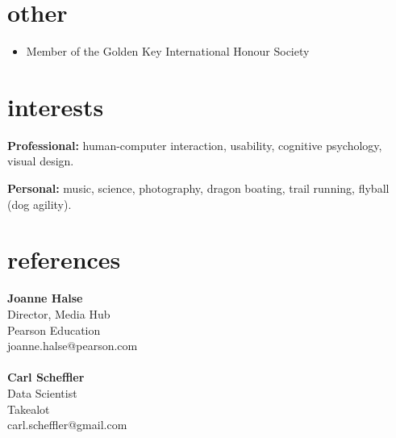 \documentclass[]{friggeri-cv} %
\begin{document}

\section{other}
\begin{itemize}
\item Member of the Golden Key International Honour Society
\end{itemize}
\pagebreak

\section{interests}

\textbf{Professional:} human-computer interaction, usability, cognitive psychology, visual design.

\textbf{Personal:} music, science, photography, dragon boating, trail running, flyball (dog agility).


\section{references}

\textbf{Joanne Halse}\\
Director, Media Hub \\
Pearson Education \\
joanne.halse@pearson.com\\
\\
\textbf{Carl Scheffler}\\
Data Scientist\\
Takealot\\
carl.scheffler@gmail.com\\

\end{document}
